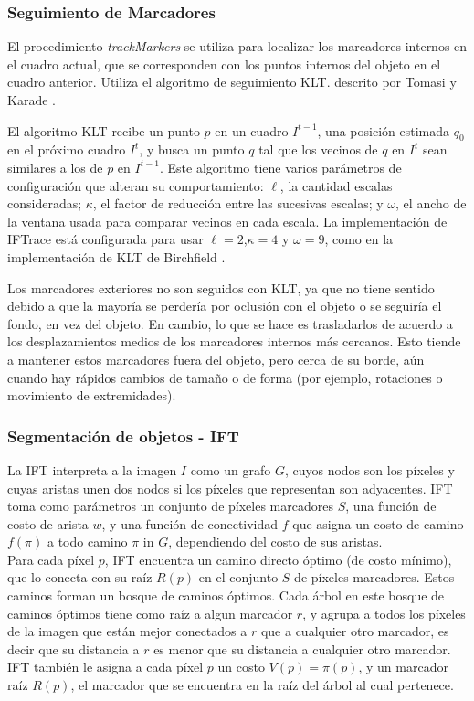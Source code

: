 \documentclass[a4paper,10pt]{article}
\begin{document}
\subsubsection{Seguimiento de Marcadores}

El procedimiento \textit{trackMarkers} se utiliza para localizar los marcadores 
internos en el cuadro actual, que se corresponden con los puntos internos del objeto
en el cuadro anterior. Utiliza el algoritmo de seguimiento KLT. descrito por Tomasi y 
Karade \cite{Tomasi91detectionand}.

El algoritmo KLT recibe un punto $p$ en un cuadro $I^{t-1}$, una posición estimada 
$q_{0}$ en el próximo cuadro $I^{t}$, y busca un punto $q$ tal que los vecinos
de $q$ en $I^{t}$ sean similares a los de $p$ en $I^{t-1}$. Este algoritmo tiene
varios parámetros de configuración que alteran su comportamiento: $\ell$, la cantidad
escalas consideradas; $\kappa$, el factor de reducción entre las sucesivas escalas; y 
$\omega$, el ancho de la ventana usada para comparar vecinos en cada escala. 
La implementación de IFTrace está configurada para usar $\ell=2$,$\kappa=4$ y 
$\omega=9$, como en la implementación de KLT de Birchfield \cite{Birchfield-KLT-implementation}.

Los marcadores exteriores no son seguidos con KLT, ya que no tiene sentido debido
a que la mayoría se perdería por oclusión con el objeto o se seguiría el fondo, en 
vez del objeto. En cambio, lo que se hace es trasladarlos de acuerdo a los 
desplazamientos medios de los marcadores internos más cercanos. Esto tiende
a mantener estos marcadores fuera del objeto, pero cerca de su borde, aún cuando
hay rápidos cambios de tamaño o de forma (por ejemplo, rotaciones o movimiento de extremidades).

\subsubsection{Segmentación de objetos - IFT}

La IFT interpreta a la imagen $I$ como un grafo $G$, cuyos nodos son los píxeles y cuyas
aristas unen dos nodos si los píxeles que representan son adyacentes. IFT toma como parámetros un conjunto de 
píxeles marcadores $S$, una función de costo de arista $w$, y una función de 
conectividad $f$ que asigna un costo de camino $f(\pi)$ a todo camino $\pi$ in $G$,
dependiendo del costo de sus aristas.\\
Para cada píxel $p$, IFT encuentra un camino directo óptimo (de costo mínimo), que lo 
conecta con su raíz $R(p)$ en el conjunto $S$ de píxeles marcadores. Estos caminos forman un bosque de caminos 
óptimos. Cada árbol en este bosque de caminos óptimos
tiene como raíz a algun marcador $r$, y agrupa a todos los píxeles de la imagen que 
están mejor conectados a $r$ que a cualquier otro marcador, es decir que su distancia a $r$ es menor
que su distancia a cualquier otro marcador. IFT también le asigna a 
cada píxel $p$ un costo $V(p) = \pi(p)$, y un marcador raíz $R(p)$, el marcador 
que se encuentra en la raíz del árbol al cual pertenece.
\end{document}
